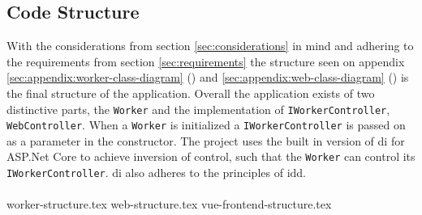 \documentclass{article}
\begin{document}
\subsection{Code Structure}
With the considerations from section \ref{sec:considerations} in mind and adhering to the requirements from section \ref{sec:requirements} the structure seen on appendix \ref{sec:appendix:worker-class-diagram} () and \ref{sec:appendix:web-class-diagram} () is the final structure of the application. Overall the application exists of two distinctive parts, the \texttt{Worker} and the implementation of \texttt{IWorkerController}, \texttt{WebController}. When a \texttt{Worker} is initialized a \texttt{IWorkerController} is passed on as a parameter in the constructor. The project uses the built in version of \gls{di}\cite{url:implementation:microsoft:dependency-injection} for ASP.Net Core to achieve inversion of control, such that the \texttt{Worker} can control its \texttt{IWorkerController}. \gls{di} also adheres to the principles of \gls{idd}.
\\\\
{worker-structure.tex}
{web-structure.tex}
{vue-frontend-structure.tex}
\end{document}
